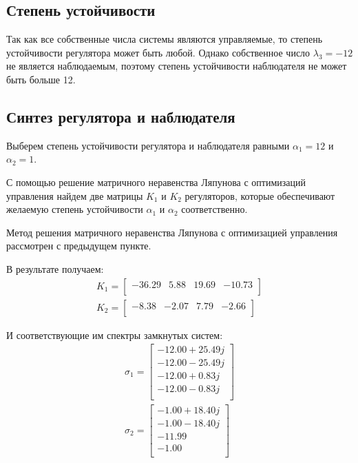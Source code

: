 \subsection{Степень устойчивости}
Так как все собственные числа системы являются управляемые, то степень устойчивости 
регулятора может быть любой. Однако собственное число $\lambda_3 = -12$ 
не является наблюдаемым, поэтому степень устойчивости наблюдателя не может
быть больше 12. 

\subsection{Синтез регулятора и наблюдателя}
Выберем степень устойчивости регулятора и наблюдателя равными $\alpha_1 = 12$ и $\alpha_2 = 1$. 

С помощью решение матричного неравенства Ляпунова с оптимизаций управления найдем 
две матрицы $K_1$ и $K_2$ регуляторов, которые обеспечивают желаемую степень устойчивости $\alpha_1$ и $\alpha_2$ соответственно.

Метод решения матричного неравенства Ляпунова с оптимизацией управления рассмотрен с предыдущем пункте. 

В результате получаем:
\begin{eqnarray}
    K_1 = \begin{bmatrix}
        -36.29  & 5.88  & 19.69  & -10.73 \\ 
    \end{bmatrix} \\ 
    K_2 = \begin{bmatrix}
        -8.38  & -2.07  & 7.79  & -2.66 \\ 
        \end{bmatrix}
\end{eqnarray}

И соответствующие им спектры замкнутых систем:
\begin{eqnarray}
    \sigma_1 = \begin{bmatrix}
        -12.00 + 25.49j \\ 
        -12.00 - 25.49j \\ 
        -12.00 + 0.83j \\ 
        -12.00 - 0.83j \\ 
    \end{bmatrix} \\ 
    \sigma_2 = \begin{bmatrix}
        -1.00 + 18.40j \\ 
        -1.00 - 18.40j \\ 
        -11.99 \\ 
        -1.00 \\ 
        \end{bmatrix}
\end{eqnarray}

